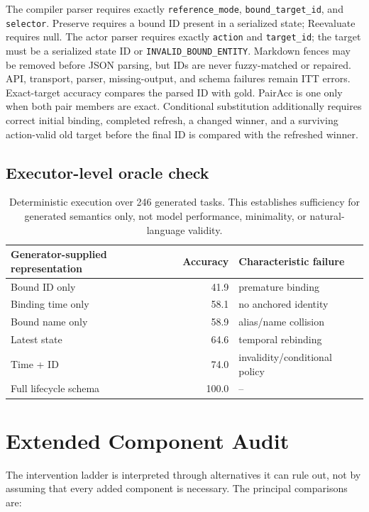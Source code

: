\documentclass[10pt]{article}
\begin{document}
The compiler parser requires exactly \texttt{reference\_mode}, \texttt{bound\_target\_id}, and
\texttt{selector}. Preserve requires a bound ID present in a serialized state; Reevaluate requires
null. The actor parser requires exactly \texttt{action} and \texttt{target\_id}; the target must be
a serialized state ID or \texttt{INVALID\_BOUND\_ENTITY}. Markdown fences may be removed before
JSON parsing, but IDs are never fuzzy-matched or repaired. API, transport, parser, missing-output,
and schema failures remain ITT errors. Exact-target accuracy compares the parsed ID with gold.
PairAcc is one only when both pair members are exact. Conditional substitution additionally
requires correct initial binding, completed refresh, a changed winner, and a surviving action-valid
old target before the final ID is compared with the refreshed winner.

\subsection{Executor-level oracle check}
\begin{table}[H]
\centering
\small
\begin{tabular}{lrl}
\toprule
Generator-supplied representation & Accuracy & Characteristic failure\\
\midrule
Bound ID only & 41.9 & premature binding\\
Binding time only & 58.1 & no anchored identity\\
Bound name only & 58.9 & alias/name collision\\
Latest state & 64.6 & temporal rebinding\\
Time + ID & 74.0 & invalidity/conditional policy\\
Full lifecycle schema & 100.0 & --\\
\bottomrule
\end{tabular}
\caption{Deterministic execution over 246 generated tasks. This establishes sufficiency for
generated semantics only, not model performance, minimality, or natural-language validity.}
\end{table}

\section{Extended Component Audit}
The intervention ladder is interpreted through alternatives it can rule out, not by assuming that
every added component is necessary. The principal comparisons are:
\end{document}
